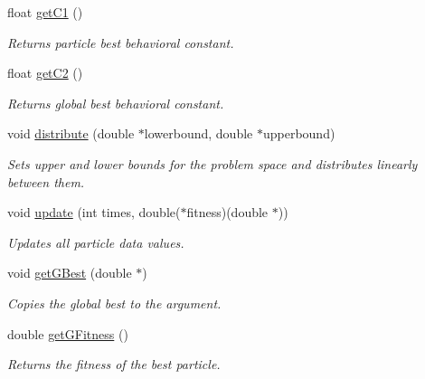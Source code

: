 \begin{DoxyCompactItemize}
\mbox{\label{classSwarm_ae765514e3fbe727b2a09b80eee2d0b4c}} 
float \mbox{\hyperlink{classSwarm_ae765514e3fbe727b2a09b80eee2d0b4c}{get\+C1}} ()
\begin{DoxyCompactList}\small\item\em Returns particle best behavioral constant. \end{DoxyCompactList}\item 
\mbox{\label{classSwarm_a64d43500d3ff5a487016b3ee508c4954}} 
float \mbox{\hyperlink{classSwarm_a64d43500d3ff5a487016b3ee508c4954}{get\+C2}} ()
\begin{DoxyCompactList}\small\item\em Returns global best behavioral constant. \end{DoxyCompactList}\item 
void \mbox{\hyperlink{classSwarm_a9da23c6a5013d4d24b1591e6a44c803e}{distribute}} (double $\ast$lowerbound, double $\ast$upperbound)
\begin{DoxyCompactList}\small\item\em Sets upper and lower bounds for the problem space and distributes linearly between them. \end{DoxyCompactList}\item 
void \mbox{\hyperlink{classSwarm_ae2156e78f44bfd081fa6cf870dfdba81}{update}} (int times, double($\ast$fitness)(double $\ast$))
\begin{DoxyCompactList}\small\item\em Updates all particle data values. \end{DoxyCompactList}\item 
\mbox{\label{classSwarm_ad569b11fd6425effd1129c52fded1ed2}} 
void \mbox{\hyperlink{classSwarm_ad569b11fd6425effd1129c52fded1ed2}{get\+G\+Best}} (double $\ast$)
\begin{DoxyCompactList}\small\item\em Copies the global best to the argument. \end{DoxyCompactList}\item 
\mbox{\label{classSwarm_a82e774fd8a91796534edf3a94adf3731}} 
double \mbox{\hyperlink{classSwarm_a82e774fd8a91796534edf3a94adf3731}{get\+G\+Fitness}} ()
\begin{DoxyCompactList}\small\item\em Returns the fitness of the best particle. \end{DoxyCompactList}\item 

\end{DoxyCompactItemize}
